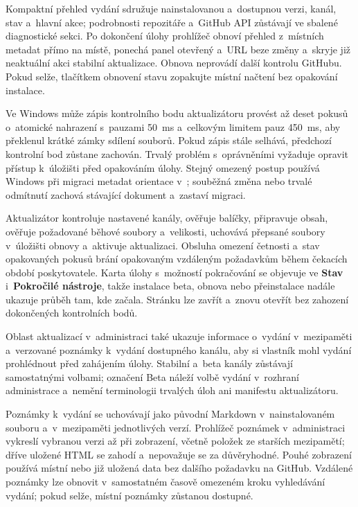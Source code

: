 \documentclass[11pt,a4paper]{article}
\newcommand{\filepath}[1]{\path{#1}}
\newcommand{\ui}[1]{\textbf{#1}}
\begin{document}
Kompaktní přehled vydání sdružuje nainstalovanou a~dostupnou verzi, kanál, stav
a~hlavní akce; podrobnosti repozitáře a~GitHub API zůstávají ve sbalené
diagnostické sekci. Po dokončení úlohy prohlížeč obnoví přehled z~místních
metadat přímo na místě, ponechá panel otevřený a~URL beze změny a~skryje již
neaktuální akci stabilní aktualizace. Obnova neprovádí další kontrolu GitHubu.
Pokud selže, tlačítkem obnovení stavu zopakujte místní načtení bez opakování
instalace.

Ve Windows může zápis kontrolního bodu aktualizátoru provést až deset pokusů
o~atomické nahrazení s~pauzami 50~ms a~celkovým limitem pauz 450~ms, aby
překlenul krátké zámky sdílení souborů. Pokud zápis stále selhává, předchozí
kontrolní bod zůstane zachován. Trvalý problém s~oprávněními vyžaduje opravit
přístup k~úložišti před opakováním úlohy. Stejný omezený postup používá Windows
při migraci metadat orientace v~\filepath{gallery.json}; souběžná změna nebo
trvalé odmítnutí zachová stávající dokument a~zastaví migraci.

Aktualizátor kontroluje nastavené kanály, ověřuje balíčky, připravuje obsah,
ověřuje požadované běhové soubory a~velikosti, uchovává přepsané soubory
v~úložišti obnovy a~aktivuje aktualizaci. Obsluha omezení četnosti a~stav
opakovaných pokusů brání opakovaným vzdáleným požadavkům během čekacích období
poskytovatele. Karta úlohy s~možností pokračování se objevuje ve \ui{Stav}
i~\ui{Pokročilé nástroje}, takže instalace beta, obnova nebo přeinstalace nadále
ukazuje průběh tam, kde začala. Stránku lze zavřít a~znovu otevřít bez zahození
dokončených kontrolních bodů.

Oblast aktualizací v~administraci také ukazuje informace o~vydání v~mezipaměti
a~verzované poznámky k~vydání dostupného kanálu, aby si vlastník mohl vydání
prohlédnout před zahájením úlohy. Stabilní a~beta kanály zůstávají samostatnými
volbami; označení Beta náleží volbě vydání v~rozhraní administrace a~nemění
terminologii trvalých úloh ani manifestu aktualizátoru.

Poznámky k~vydání se uchovávají jako původní Markdown v~nainstalovaném souboru
\filepath{PATCH_NOTES.md} a~v~mezipaměti jednotlivých verzí. Prohlížeč poznámek
v~administraci vykreslí vybranou verzi až při zobrazení, včetně položek ze
starších mezipamětí; dříve uložené HTML se zahodí a~nepovažuje se za
důvěryhodné. Pouhé zobrazení používá místní nebo již uložená data bez dalšího
požadavku na GitHub. Vzdálené poznámky lze obnovit v~samostatném časově omezeném
kroku vyhledávání vydání; pokud selže, místní poznámky zůstanou dostupné.
\end{document}
